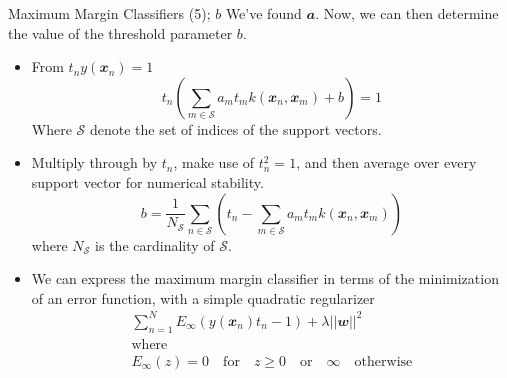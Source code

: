 \documentclass{bredelebeamer}
\begin{document}
\begin{frame}{Maximum Margin Classifiers (5); $b$}
  We've found $\mathbfit{a}$. Now, we can then determine the value of the
  threshold parameter $b$.
  \begin{itemize}
    \item From $t_n y(\mathbfit{x}_n) = 1$
    \begin{equation}
      t_n \left(
        \sum_{m\in\mathcal{S}} a_m t_m k(\mathbfit{x}_n, \mathbfit{x}_m) + b
      \right) = 1
    \end{equation}
    Where $\mathcal{S}$ denote the set of indices of the support vectors.
    \item Multiply through by $t_n$, make use of $t_n^2 = 1$, and then average
          over every support vector for numerical stability.
    \begin{equation}
      b = \frac{1}{N_\mathcal{S}}
      \sum_{n \in \mathcal{S}}\left(
      t_n - \sum_{m\in\mathcal{S}} a_m t_m k(\mathbfit{x}_n, \mathbfit{x}_m)
      \right)
    \end{equation}
    where $N_\mathcal{S}$ is the cardinality of $\mathcal{S}$.
    \item We can express the maximum margin classifier in terms of the minimization
    of an error function, with a simple quadratic regularizer
    \begin{equation}
      \begin{gathered}
        \sum_{n=1}^N E_{\infty}(y(\mathbfit{x}_n)t_n - 1) + \lambda{||\mathbfit{w}||}^2 \\
        \textrm{where} \\
        E_{\infty}(z) = 0 \quad \mathrm{for} \quad z \geq 0 \quad \mathrm{or} \quad \infty \quad \mathrm{otherwise}
      \end{gathered}
    \end{equation}
  \end{itemize}
\end{frame}
\end{document}

